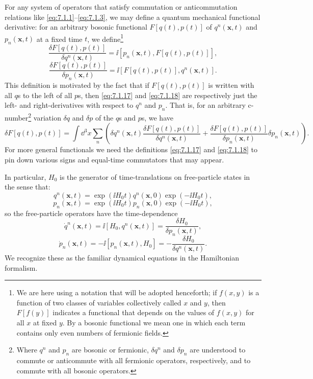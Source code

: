 For any system of operators that satisfy commutation or anticommutation
relations like \eqref{eq:7.1.1}--\eqref{eq:7.1.3}, we may define a quantum mechanical
functional derivative: for an arbitrary bosonic functional $F[q(t),p(t)]$ of
$q^n(\mathbf{x},t)$ and $p_n(\mathbf{x},t)$ at a fixed time $t$, we define\footnote{We
are here using a notation that will be adopted henceforth; if $f(x,y)$ is a
function of two classes of variables collectively called $x$ and $y$, then
$F[f(y)]$ indicates a functional that depends on the values of $f(x,y)$ for
all $x$ at fixed $y$. By a bosonic functional we mean one in which each term
contains only even numbers of fermionic fields.}
\begin{equation}
\frac{\delta F[q(t),p(t)]}{\delta q^n(\mathbf{x},t)}
=\ii[p_n(\mathbf{x},t),F[q(t),p(t)]],
\tag{7.1.17}\label{eq:7.1.17}
\end{equation}
\begin{equation}
\frac{\delta F[q(t),p(t)]}{\delta p_n(\mathbf{x},t)}
=\ii[F[q(t),p(t)],q^n(\mathbf{x},t)].
\tag{7.1.18}\label{eq:7.1.18}
\end{equation}
This definition is motivated by the fact that if $F[q(t),p(t)]$ is written with
all $q$s to the left of all $p$s, then \eqref{eq:7.1.17} and \eqref{eq:7.1.18} are respectively just
the left- and right-derivatives with respect to $q^n$ and $p_n$. That is, for an
arbitrary c-number\footnote{Where $q^n$ and $p_n$ are bosonic or fermionic,
$\delta q^n$ and $\delta p_n$ are understood to commute or anticommute with all
fermionic operators, respectively, and to commute with all bosonic operators.}
variation $\delta q$ and $\delta p$ of the $q$s and $p$s, we have
\[
\delta F[q(t),p(t)]=\int \dd^3x\sum_n\left(
\delta q^n(\mathbf{x},t)\frac{\delta F[q(t),p(t)]}{\delta q^n(\mathbf{x},t)}
+\frac{\delta F[q(t),p(t)]}{\delta p_n(\mathbf{x},t)}\delta p_n(\mathbf{x},t)
\right).
\]
For more general functionals we need the definitions \eqref{eq:7.1.17} and \eqref{eq:7.1.18}
to pin down various signs and equal-time commutators that may appear.

In particular, $H_0$ is the generator of time-translations on free-particle
states in the sense that:
\begin{equation}
q^n(\mathbf{x},t)=\exp(\ii H_0t)q^n(\mathbf{x},0)\exp(-\ii H_0t),
\tag{7.1.19}\label{eq:7.1.19}
\end{equation}
\begin{equation}
p_n(\mathbf{x},t)=\exp(\ii H_0t)p_n(\mathbf{x},0)\exp(-\ii H_0t),
\tag{7.1.20}\label{eq:7.1.20}
\end{equation}
so the free-particle operators have the time-dependence
\begin{equation}
\dot q^n(\mathbf{x},t)=\ii[H_0,q^n(\mathbf{x},t)]
=\frac{\delta H_0}{\delta p_n(\mathbf{x},t)},
\tag{7.1.21}\label{eq:7.1.21}
\end{equation}
\begin{equation}
\dot p_n(\mathbf{x},t)=-\ii[p_n(\mathbf{x},t),H_0]
=-\frac{\delta H_0}{\delta q^n(\mathbf{x},t)}.
\tag{7.1.22}\label{eq:7.1.22}
\end{equation}
We recognize these as the familiar dynamical equations in the Hamiltonian
formalism.

